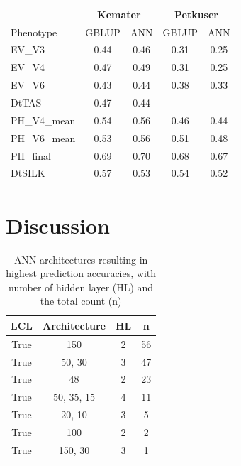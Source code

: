 \onehalfspacing
\begin{table}[H]
\centering
\begin{tabular}{lcc|cc}
  \toprule
  & \multicolumn{2}{c}{\textbf{Kemater}}  & \multicolumn{2}{c}{\textbf{Petkuser}} \\
  Phenotype & GBLUP & ANN & GBLUP & ANN \\ 
  \midrule
  EV\_V3 & 0.44 & 0.46 & 0.31 & 0.25 \\ 
  EV\_V4 & 0.47 & 0.49 & 0.31 & 0.25 \\ 
  EV\_V6 & 0.43 & 0.44 & 0.38 & 0.33 \\ 
  DtTAS & 0.47 & 0.44 &  &  \\ 
  PH\_V4\_mean & 0.54 & 0.56 & 0.46 & 0.44 \\ 
  PH\_V6\_mean & 0.53 & 0.56 & 0.51 & 0.48 \\ 
  PH\_final & 0.69 & 0.70 & 0.68 & 0.67 \\ 
  DtSILK & 0.57 & 0.53 & 0.54 & 0.52 \\ 
  \bottomrule
\end{tabular}
\end{table}
\doublespacing


\section{Discussion}

\onehalfspacing
\begin{table}[H]
  \centering
  \caption[ANN architectures of ANN resulting in highest prediction accuracies]{ANN architectures resulting in highest prediction accuracies, with number of hidden layer (HL) and the total count (n)}
  \begin{tabular}{cccc}
  \toprule
    LCL & Architecture & HL & n \\ 
   \midrule
    True &  150        & 2 &  56  \\ 
    True &  50, 30     & 3 &  47  \\ 
    True &  48         & 2 &  23  \\ 
    True &  50, 35, 15 & 4 &  11  \\ 
    True &  20, 10     & 3 &   5  \\ 
    True &  100        & 2 &   2  \\ 
    True &  150, 30    & 3 &   1  \\ 
   \bottomrule
\end{tabular}
\end{table}
\doublespacing